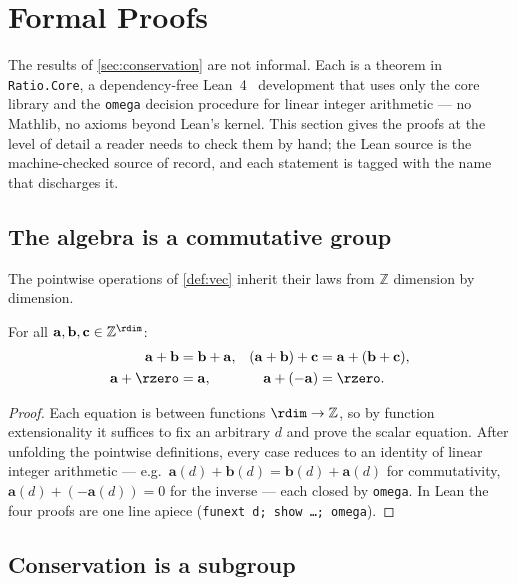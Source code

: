 \section{Formal Proofs}
\label{sec:proofs}

The results of \cref{sec:conservation} are not informal. Each is a
theorem in \texttt{Ratio.Core}, a dependency-free Lean~4~\cite{demoura2021lean}
development that
uses only the core library and the \texttt{omega} decision procedure for
linear integer arithmetic --- no Mathlib, no axioms beyond Lean's
kernel. This section gives the proofs at the level of detail a reader
needs to check them by hand; the Lean source is the machine-checked
source of record, and each statement is tagged with the name that
discharges it.

\subsection{The algebra is a commutative group}

The pointwise operations of \cref{def:vec} inherit their laws from
$\mathbb{Z}$ dimension by dimension.

\begin{lemma}
\label{lem:group}
For all $\mathbf{a},\mathbf{b},\mathbf{c} \in \mathbb{Z}^{\rdim}$:
\[
\begin{aligned}
  \mathbf{a}+\mathbf{b} &= \mathbf{b}+\mathbf{a}, &
  (\mathbf{a}+\mathbf{b})+\mathbf{c} &= \mathbf{a}+(\mathbf{b}+\mathbf{c}), \\
  \mathbf{a}+\rzero &= \mathbf{a}, &
  \mathbf{a}+(-\mathbf{a}) &= \rzero.
\end{aligned}
\]
\end{lemma}

\begin{proof}
Each equation is between functions $\rdim \to \mathbb{Z}$, so by
function extensionality it suffices to fix an arbitrary $d$ and prove the
scalar equation. After unfolding the pointwise definitions, every case
reduces to an identity of linear integer arithmetic --- e.g.\
$\mathbf{a}(d) + \mathbf{b}(d) = \mathbf{b}(d) + \mathbf{a}(d)$ for
commutativity, $\mathbf{a}(d) + (-\mathbf{a}(d)) = 0$ for the inverse ---
each closed by \texttt{omega}. In Lean the four proofs are one line apiece
(\texttt{funext d; show \ldots; omega}).
\end{proof}

\subsection{Conservation is a subgroup}

